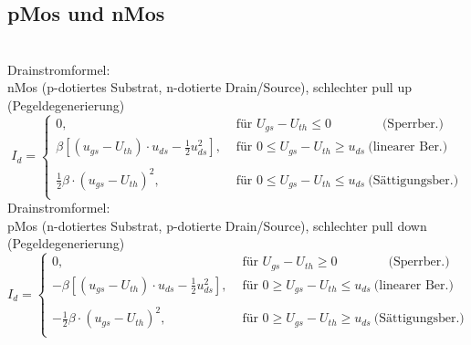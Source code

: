 \documentclass[6pt,a4paper]{scrartcl}
\begin{document}
\begin{multicols}{3}
{		\subsection{pMos und nMos}
	\\	
	
	Drainstromformel:\\
	nMos (p-dotiertes Substrat, n-dotierte Drain/Source), schlechter pull up (Pegeldegenerierung)
	\begin{equation*}
	\!\!\! I_d = \begin{cases}
	0, &\text{ für }  U_{gs} - U_{th} \le 0 \qquad \qquad  \text{(Sperrber.)}\\[0.2em]
	 \beta [(u_{gs} - U_{th}) \cdot u_{ds} - \frac{1}{2} u_{ds}^2] , &\text{ für }  0 \le U_{gs} - U_{th} \ge u_{ds} \  \text{(linearer Ber.)}\\\\[0.2em]
	 \frac{1}{2} \beta \cdot (u_{gs} - U_{th})^2, &\text{ für }  0 \le U_{gs} - U_{th} \le u_{ds} \  \text{(Sättigungsber.)}\\

	\end{cases}
	\end{equation*}
	Drainstromformel: \\
	pMos (n-dotiertes Substrat, p-dotierte Drain/Source), schlechter pull down (Pegeldegenerierung)
	\begin{equation*}
	\!\!\! I_d = \begin{cases}
	0, &\text{ für }  U_{gs} - U_{th} \ge 0 \qquad \qquad  \text{(Sperrber.)}\\[0.2em]
	- \beta [(u_{gs} - U_{th}) \cdot u_{ds} - \frac{1}{2} u_{ds}^2] , &\text{ für }  0 \ge U_{gs} - U_{th} \le u_{ds} \  \text{(linearer Ber.)}\\\\[0.2em]
	- \frac{1}{2} \beta \cdot (u_{gs} - U_{th})^2, &\text{ für }  0 \ge U_{gs} - U_{th} \ge u_{ds} \  \text{(Sättigungsber.)}\\


\end{cases}
\end{equation*}}
\end{multicols}
\end{document}
